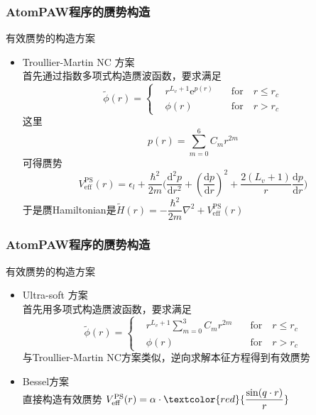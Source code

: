 {{\frame
{
	\frametitle{\textrm{AtomPAW}程序的赝势构造}
	有效赝势的构造方案
	\begin{itemize}
		\item \textrm{Troullier-Martin NC} 方案 \\
	首先通过指数多项式构造赝波函数，要求满足
	\begin{displaymath}
		\tilde\phi(r)=\left\{
			\begin{aligned}
				&r^{L_v+1}\mathrm{e}^{p(r)}\quad &\mathrm{for}\quad r\leqslant r_c \\
				&\phi(r)\quad &\mathrm{for}\quad r>r_c
			\end{aligned}
			\right.
	\end{displaymath}
	这里$$p(r)=\sum_{m=0}^6C_mr^{2m}$$
	可得赝势 
	$$V_{\mathrm{eff}}^{\mathrm{PS}}(r)=\epsilon_l+\dfrac{\hbar^2}{2m}\bigg(\dfrac{\mathrm{d}^2p}{\mathrm{d}r^2}+(\dfrac{\mathrm{d}p}{\mathrm{d}r})^2+\dfrac{2(L_v+1)}r\dfrac{\mathrm{d}p}{\mathrm{d}r}\bigg)$$
	于是赝\textrm{Hamiltonian}是$\tilde H(r)=-\dfrac{\hbar^2}{2m}\nabla^2+V_{\mathrm{eff}}^{\mathrm{PS}}(r)$
	\end{itemize}
}
\frame
{
	\frametitle{\textrm{AtomPAW}程序的赝势构造}
	有效赝势的构造方案
	\begin{itemize}
		\item \textrm{Ultra-soft} 方案 \\
	首先用多项式构造赝波函数，要求满足
	\begin{displaymath}
		\tilde\phi(r)=\left\{
			\begin{aligned}
				&r^{L_v+1}\sum_{m=0}^3C_mr^{2m}\quad &\mathrm{for}\quad r\leqslant r_c \\
				&\phi(r)\quad &\mathrm{for}\quad r>r_c
			\end{aligned}
			\right.
	\end{displaymath}
	与\textrm{Troullier-Martin NC}方案类似，逆向求解本征方程得到有效赝势
		\item \textrm{Bessel}方案\\
			直接构造有效赝势 $V_{\mathrm{eff}}^{\mathrm{PS}}(r)=\alpha\cdot\textcolor{red}{\dfrac{\sin(q\cdot r)}r}$
	\end{itemize}
}

}}
